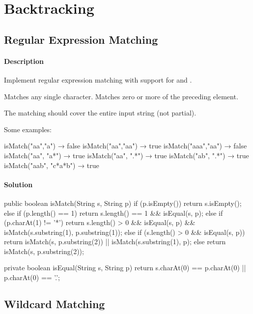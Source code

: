 \chapter{Backtracking}

\section{Regular Expression Matching} %

\subsubsection{Description}
Implement regular expression matching with support for  and .

 Matches any single character.
 Matches zero or more of the preceding element.

The matching should cover the entire input string (not partial).

Some examples:
\begin{Code}
isMatch("aa","a") → false
isMatch("aa","aa") → true
isMatch("aaa","aa") → false
isMatch("aa", "a*") → true
isMatch("aa", ".*") → true
isMatch("ab", ".*") → true
isMatch("aab", "c*a*b") → true
\end{Code}

\subsubsection{Solution}

\begin{Code}
public boolean isMatch(String s, String p) {
    if (p.isEmpty()) {
        return s.isEmpty();
    } else if (p.length() == 1) {
        return s.length() == 1 && isEqual(s, p);
    } else if (p.charAt(1) != '*') {
        return s.length() > 0 && isEqual(s, p) && isMatch(s.substring(1), p.substring(1));
    } else {
        if (s.length() > 0 && isEqual(s, p)) {
            return isMatch(s, p.substring(2)) || isMatch(s.substring(1), p);
        } else {
            return isMatch(s, p.substring(2));
        }
    }
}

private boolean isEqual(String s, String p) {
    return s.charAt(0) == p.charAt(0) || p.charAt(0) == '.';
}
\end{Code}

\newpage

\section{Wildcard Matching} %

